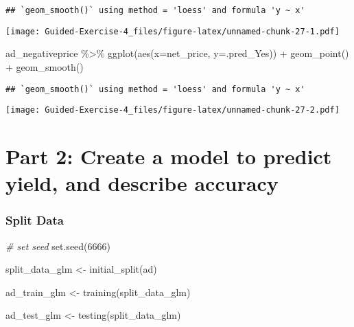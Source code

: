 \documentclass[
]{article}
\newenvironment{Shaded}{\begin{snugshade}}{\end{snugshade}}
\newcommand{\AttributeTok}[1]{\textcolor[rgb]{0.77,0.63,0.00}{#1}}
\newcommand{\CommentTok}[1]{\textcolor[rgb]{0.56,0.35,0.01}{\textit{#1}}}
\newcommand{\DecValTok}[1]{\textcolor[rgb]{0.00,0.00,0.81}{#1}}
\newcommand{\FunctionTok}[1]{\textcolor[rgb]{0.00,0.00,0.00}{#1}}
\newcommand{\NormalTok}[1]{#1}
\newcommand{\OtherTok}[1]{\textcolor[rgb]{0.56,0.35,0.01}{#1}}
\newcommand{\SpecialCharTok}[1]{\textcolor[rgb]{0.00,0.00,0.00}{#1}}
\begin{document}
\begin{verbatim}
## `geom_smooth()` using method = 'loess' and formula 'y ~ x'
\end{verbatim}

\texttt{[image: Guided-Exercise-4\_files/figure-latex/unnamed-chunk-27-1.pdf]}

\begin{Shaded}
\begin{Highlighting}[]
\NormalTok{ad\_negativeprice }\SpecialCharTok{\%\textgreater{}\%}
  \FunctionTok{ggplot}\NormalTok{(}\FunctionTok{aes}\NormalTok{(}\AttributeTok{x=}\NormalTok{net\_price, }\AttributeTok{y=}\NormalTok{.pred\_Yes)) }\SpecialCharTok{+} 
  \FunctionTok{geom\_point}\NormalTok{() }\SpecialCharTok{+}
  \FunctionTok{geom\_smooth}\NormalTok{()}
\end{Highlighting}
\end{Shaded}

\begin{verbatim}
## `geom_smooth()` using method = 'loess' and formula 'y ~ x'
\end{verbatim}

\texttt{[image: Guided-Exercise-4\_files/figure-latex/unnamed-chunk-27-2.pdf]}

\hypertarget{part-2-create-a-model-to-predict-yield-and-describe-accuracy}{%
\section{Part 2: Create a model to predict yield, and describe
accuracy}\label{part-2-create-a-model-to-predict-yield-and-describe-accuracy}}

\hypertarget{split-data}{%
\subsubsection{Split Data}\label{split-data}}

\begin{Shaded}
\begin{Highlighting}[]
\CommentTok{\# set seed }
\FunctionTok{set.seed}\NormalTok{(}\DecValTok{6666}\NormalTok{)}

\NormalTok{split\_data\_glm }\OtherTok{\textless{}{-}} \FunctionTok{initial\_split}\NormalTok{(ad)}

\NormalTok{ad\_train\_glm }\OtherTok{\textless{}{-}} \FunctionTok{training}\NormalTok{(split\_data\_glm)}

\NormalTok{ad\_test\_glm }\OtherTok{\textless{}{-}} \FunctionTok{testing}\NormalTok{(split\_data\_glm)}
\end{Highlighting}
\end{Shaded}
\end{document}
